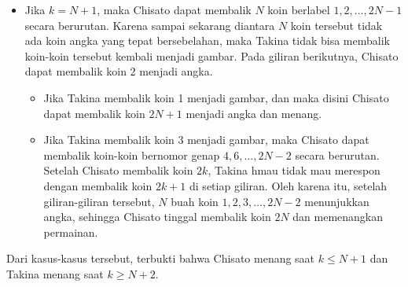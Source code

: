 \documentclass[11pt]{scrartcl}
\begin{document}
\begin{soaljawab}
\begin{solusi}
\begin{itemize}
        \item Jika $k = N+1$, maka Chisato dapat membalik $N$ koin berlabel $1,2,\dots,2N-1$ secara berurutan. Karena sampai sekarang diantara $N$ koin tersebut tidak ada koin angka yang tepat bersebelahan, maka Takina tidak bisa membalik koin-koin tersebut kembali  menjadi gambar. Pada giliran berikutnya, Chisato dapat membalik koin 2 menjadi angka. 
        \begin{itemize}
            \item Jika Takina membalik koin 1 menjadi gambar, dan maka disini Chisato dapat membalik koin $2N+1$ menjadi angka dan menang.
            \item Jika Takina membalik koin 3 menjadi gambar, maka Chisato dapat membalik koin-koin bernomor genap $4,6,\dots,2N-2$ secara berurutan. Setelah Chisato membalik koin $2k$, Takina hmau tidak mau merespon dengan membalik koin $2k+1$ di setiap giliran. Oleh karena itu, setelah giliran-giliran tersebut,  $N$ buah koin $1,2,3,\dots, 2N-2$ menunjukkan angka, sehingga Chisato tinggal membalik koin $2N$ dan memenangkan permainan.
        \end{itemize}
        \end{itemize}
        Dari kasus-kasus tersebut, terbukti bahwa Chisato menang saat $k \le N+1$ dan Takina menang saat $k \ge N+2$.
    \end{solusi}
\end{soaljawab}
\end{document}
